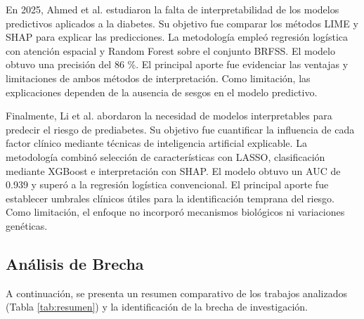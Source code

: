 \documentclass[journal]{IEEEtran}
\begin{document}
En 2025, Ahmed et al. \cite{Ahmed2025} estudiaron la falta de interpretabilidad de los modelos predictivos aplicados a la diabetes. Su objetivo fue comparar los métodos LIME y SHAP para explicar las predicciones. La metodología empleó regresión logística con atención espacial y Random Forest sobre el conjunto BRFSS. El modelo obtuvo una precisión del 86 \%. El principal aporte fue evidenciar las ventajas y limitaciones de ambos métodos de interpretación. Como limitación, las explicaciones dependen de la ausencia de sesgos en el modelo predictivo.

Finalmente, Li et al. \cite{Li2025} abordaron la necesidad de modelos interpretables para predecir el riesgo de prediabetes. Su objetivo fue cuantificar la influencia de cada factor clínico mediante técnicas de inteligencia artificial explicable. La metodología combinó selección de características con LASSO, clasificación mediante XGBoost e interpretación con SHAP. El modelo obtuvo un AUC de 0.939 y superó a la regresión logística convencional. El principal aporte fue establecer umbrales clínicos útiles para la identificación temprana del riesgo. Como limitación, el enfoque no incorporó mecanismos biológicos ni variaciones genéticas.

\subsection{Análisis de Brecha}

A continuación, se presenta un resumen comparativo de los trabajos analizados (Tabla \ref{tab:resumen}) y la identificación de la brecha de investigación.
\end{document}
